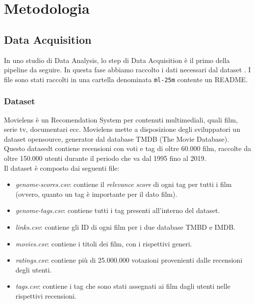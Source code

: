 \documentclass[../../Report.tex]{subfiles}
\begin{document}
\chapter{Metodologia}

\section{Data Acquisition}
In uno studio di Data Analysis, lo step di Data Acquisition è il primo della pipeline da seguire.
In questa fase abbiamo raccolto i dati necessari dal dataset \cite[MovieLens]{MovieLens}.
I file sono stati raccolti in una cartella denominata \texttt{ml-25m} contente un README.


\subsection*{Dataset}
\label{dataset}

Movielens è un Recomendation System per contenuti multimediali, quali film, serie tv, documentari ecc.
Movielens mette a disposizione degli sviluppatori un dataset opensource, generator dal database TMDB (The Movie Database).
Questo datasedt contiene recensioni con voti e tag di oltre 60.000 film, raccolte da oltre 150.000 utenti durante il periodo che va dal 1995 fino al 2019.
\\
Il dataset è composto dai seguenti file:
\begin{itemize}
    \item \textit{genome-scores.csv}: contiene il \textit{relevance score} di ogni tag per tutti i film (ovvero, quanto un tag è importante per il dato film).
    \item \textit{genome-tags.csv}: contiene tutti i tag presenti all'interno del dataset.
    \item \textit{links.csv}: contiene gli ID di ogni film per i due database TMBD e IMDB.
    \item \textit{movies.csv}: contiene i titoli dei film, con i rispettivi generi.
    \item \textit{ratings.csv}: contiene più di 25.000.000 votazioni provenienti dalle recensioni degli utenti.
    \item \textit{tags.csv}: contiene i tag che sono stati assegnati ai film dagli utenti nelle rispettivi recensioni.
\end{itemize}
\end{document}
